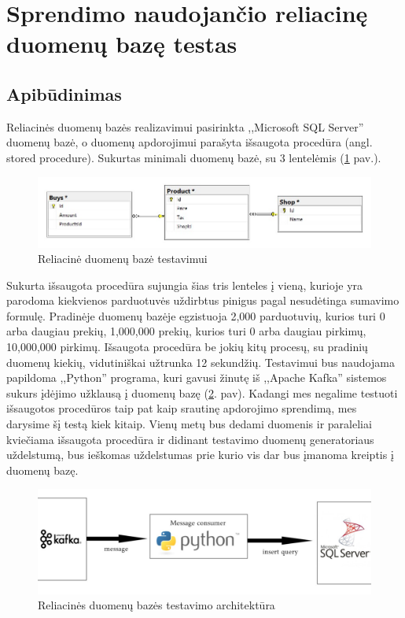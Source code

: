 \documentclass{VUMIFPSkursinis}
\begin{document}
\section{Sprendimo naudojančio reliacinę duomenų bazę testas}

\subsection{Apibūdinimas}

Reliacinės duomenų bazės realizavimui pasirinkta ,,Microsoft SQL Server'' duomenų bazė, o duomenų apdorojimui parašyta išsaugota procedūra (angl. stored procedure).
Sukurtas minimali duomenų bazė, su 3 lentelėmis (\ref{fig:dbdiagram} pav.).
\begin{figure}[!htbp]
    \centering
    \includegraphics[width=1\textwidth]{img/dbdiagram.jpg}
    \caption{Reliacinė duomenų bazė testavimui}
    \label{fig:dbdiagram}
\end{figure}

Sukurta išsaugota procedūra sujungia šias tris lenteles į vieną, kurioje yra parodoma kiekvienos parduotuvės uždirbtus pinigus pagal nesudėtinga sumavimo formulę.
Pradinėje duomenų bazėje egzistuoja 2,000 parduotuvių, kurios turi 0 arba daugiau prekių, 1,000,000 prekių, kurios turi 0 arba daugiau pirkimų, 10,000,000 pirkimų.
Išsaugota procedūra be jokių kitų procesų, su pradinių duomenų kiekių, vidutiniškai užtrunka 12 sekundžių. Testavimui bus naudojama papildoma ,,Python'' programa,
kuri gavusi žinutę iš ,,Apache Kafka'' sistemos sukurs įdėjimo užklausą į duomenų bazę (\ref{fig:generator}. pav). Kadangi mes negalime testuoti išsaugotos procedūros taip 
pat kaip srautinę apdorojimo sprendimą, mes darysime šį testą kiek kitaip. Vienų metų bus dedami duomenis ir paraleliai kviečiama išsaugota procedūra ir didinant 
testavimo duomenų generatoriaus uždelstumą, bus ieškomas uždelstumas prie kurio vis dar bus įmanoma kreiptis į duomenų bazę.

\begin{figure}[!htbp]
    \centering
    \includegraphics[width=1\textwidth]{img/dbms2.jpg}
    \caption{Reliacinės duomenų bazės testavimo architektūra}
    \label{fig:generator}
\end{figure}
\end{document}
